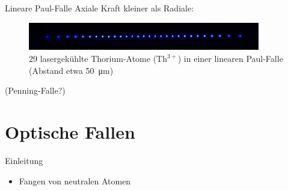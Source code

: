 \documentclass[12pt]{beamer}
\begin{document}
\begin{frame}{Lineare Paul-Falle}
Axiale Kraft kleiner als Radiale:
\begin{figure}[h]
	\centering
	\includegraphics[width=0.9\textwidth]{./figures/29_laser_cooled_ion_chain.jpg}
	\caption{29 lasergekühlte Thorium-Atome ($\mathrm{Th}^{3+}$) in einer linearen Paul-Falle (Abstand etwa \SI{50}{\micro\metre}) \cite{campbell}}
\end{figure}

(Penning-Falle?)

\end{frame}

\section{Optische Fallen}

\begin{frame}{Einleitung}
	\begin{itemize}
		\item Fangen von neutralen Atomen
	\end{itemize}
\end{frame}
\end{document}
